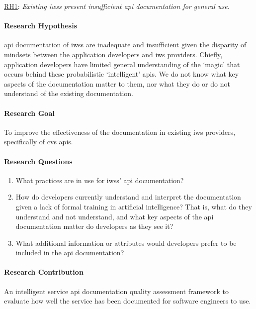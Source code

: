 \begin{titled-frame}{\underline{RH1}: \textit{Existing \glspl{iws} present insufficient \gls{api} documentation for general use.} }
\label{rh1}
\vspace{-12pt}
\paragraph{Research Hypothesis}
\gls{api} documentation of \glspl{iws} are inadequate and insufficient given the disparity of mindsets between the application developers and \gls{iws} providers. Chiefly, application developers have limited general understanding of the `magic' that occurs behind these probabilistic `intelligent' \glspl{api}. We do not know what key aspects of the documentation matter to them, nor what they do or do not understand of the existing documentation.

\paragraph{Research Goal}
To improve the effectiveness of the documentation in existing \gls{iws} providers, specifically of \gls{cvs} \glspl{api}.

\paragraph{Research Questions}
\begin{enumerate}[label=\textbf{RQ1.\arabic*.}, ref=RQ1.\arabic*, leftmargin=3.5\parindent, rightmargin=1\parindent]
  \item What practices are in use for \glspl{iws}' \gls{api} documentation? 
  \label{rqs:apidoc:what-is-in-use}
  
  \item How do developers currently understand and interpret the documentation given a lack of formal training in artificial intelligence? That is, what do they understand and not understand, and what key aspects of the \gls{api} documentation matter do developers as they see it?
  \label{rqs:apidoc:how-do-devs-understand-it}
  
  \item What additional information or attributes would developers prefer to be included in the \gls{api} documentation?
  \label{rqs:apidoc:what-additional-information-needed}
\end{enumerate}

\paragraph{Research Contribution} An intelligent service \gls{api} documentation quality assessment framework to evaluate how well the service has been documented for software engineers to use.

\end{titled-frame}


